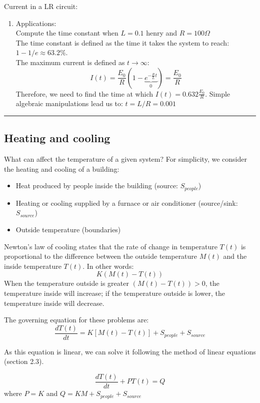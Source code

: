 \begin{exmp}{Current in a LR circuit:}
\begin{enumerate}
\item Applications:\\
Compute the time constant when $L=0.1$ henry and $R=100 \Omega$\\ 
The time constant is defined as the time it takes the system to reach: $1-1/e\approx 63.2\%$.\\
The maximum current is defined as $t\rightarrow\infty$:
\begin{equation*}
I(t)=\frac{E_0}{R}\left(1-\underbrace{e^{-\frac{R}{L}t}}_0\right)=\frac{E_0}{R}
\end{equation*}
Therefore, we need to find the time at which $I(t)=0.632 \frac{E_0}{R}$.
Simple algebraic manipulations lead us to: $t=L/R=0.001$
\end{enumerate}
\end{exmp}
\begin{center}
\noindent\rule{4cm}{0.4pt}
\end{center}




\subsection{Heating and cooling}


\begin{testv}{}{}
What can affect the temperature of a given system? For simplicity, we consider the heating and cooling of a building:
\begin{itemize}
\item Heat produced by people inside the building (source: $S_{people}$)
\item Heating or cooling supplied by a furnace or air conditioner (source/sink: $S_{source}$)
\item Outside temperature (boundaries)
\end{itemize}
Newton's law of cooling states that the rate of change in temperature $T(t)$ is proportional to the difference between the outside temperature $M(t)$ and the inside temperature $T(t)$. In other words:
\begin{equation*}
K\left(M(t)-T(t)\right)
\end{equation*}
When the temperature outside is greater $(M(t)-T(t))>0$, the temperature inside will increase; if the temperature outside is lower, the temperature inside will decrease.

The governing equation for these problems are:
\begin{equation*}
\frac{dT(t)}{dt}=K\left[M(t)-T(t)\right] + S_{people}+S_{source}
\end{equation*}

As this equation is linear, we can solve it following the method of linear equations (section 2.3).

\begin{equation*}
\frac{dT(t)}{dt}+P T(t)=Q
\end{equation*}
where $P=K$ and $Q=KM+S_{people}+S_{source}$
\end{testv}

